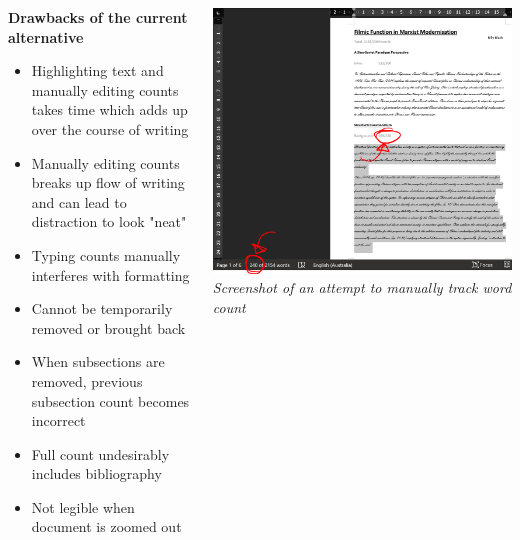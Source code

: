 \documentclass[unknownkeysallowed,usepdftitle=false, parskip=full]{beamer}
\newcommand{\secvariable}{nothing}
\newcommand{\mysection}[1]{\renewcommand{\secvariable}{#1}
}
\begin{document}
\mysection{radar}
\begin{frame}\label{\secvariable}
  \begin{columns}[t]
    \begin{column}[c]{0.45\textwidth}
    \parbox{\linewidth}{
\scriptsize
    \textbf{Drawbacks of the current alternative}
    
    \vspace{10pt}
      
      \begin{itemize}
          \item Highlighting text and manually editing counts takes time which adds up over the course of writing
          \item Manually editing counts breaks up flow of writing and can lead to distraction to look "neat"
          \item Typing counts manually interferes with formatting
          \item Cannot be temporarily removed or brought back
          \item When subsections are removed, previous subsection count becomes incorrect
          \item Full count undesirably includes bibliography
          \item Not legible when document is zoomed out
      \end{itemize}
      }
    \end{column}
    \begin{column}[c]{0.6\textwidth}
\includegraphics[scale=0.5]{figure/currentway.PNG}\\
\tiny{\textit{Screenshot of an attempt to manually track word count}}
    \end{column}
  \end{columns}

  
\end{frame}
\end{document}
